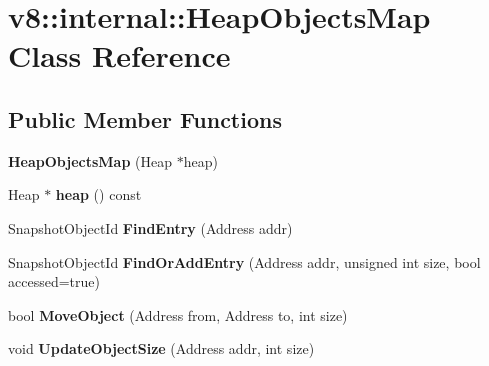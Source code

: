 \hypertarget{classv8_1_1internal_1_1_heap_objects_map}{}\section{v8\+:\+:internal\+:\+:Heap\+Objects\+Map Class Reference}
\label{classv8_1_1internal_1_1_heap_objects_map}
\subsection*{Public Member Functions}
\begin{DoxyCompactItemize}
\item 
\hypertarget{classv8_1_1internal_1_1_heap_objects_map_ae05dd1e9392b3a3389440228746546d2}{}{\bfseries Heap\+Objects\+Map} (Heap $\ast$heap)\label{classv8_1_1internal_1_1_heap_objects_map_ae05dd1e9392b3a3389440228746546d2}

\item 
\hypertarget{classv8_1_1internal_1_1_heap_objects_map_ad291335c6fcb82761fde7152a739ec0e}{}Heap $\ast$ {\bfseries heap} () const \label{classv8_1_1internal_1_1_heap_objects_map_ad291335c6fcb82761fde7152a739ec0e}

\item 
\hypertarget{classv8_1_1internal_1_1_heap_objects_map_ab5d737fbbba9b33cd3c853eb7b506cf4}{}Snapshot\+Object\+Id {\bfseries Find\+Entry} (Address addr)\label{classv8_1_1internal_1_1_heap_objects_map_ab5d737fbbba9b33cd3c853eb7b506cf4}

\item 
\hypertarget{classv8_1_1internal_1_1_heap_objects_map_a0782b8e7d38d2d3f8805bf9525b933c6}{}Snapshot\+Object\+Id {\bfseries Find\+Or\+Add\+Entry} (Address addr, unsigned int size, bool accessed=true)\label{classv8_1_1internal_1_1_heap_objects_map_a0782b8e7d38d2d3f8805bf9525b933c6}

\item 
\hypertarget{classv8_1_1internal_1_1_heap_objects_map_a4dbb05ebfb10dd823495d0802692a1f5}{}bool {\bfseries Move\+Object} (Address from, Address to, int size)\label{classv8_1_1internal_1_1_heap_objects_map_a4dbb05ebfb10dd823495d0802692a1f5}

\item 
\hypertarget{classv8_1_1internal_1_1_heap_objects_map_a15a31776da26230e3641837998095544}{}void {\bfseries Update\+Object\+Size} (Address addr, int size)\label{classv8_1_1internal_1_1_heap_objects_map_a15a31776da26230e3641837998095544}


\end{DoxyCompactItemize}

